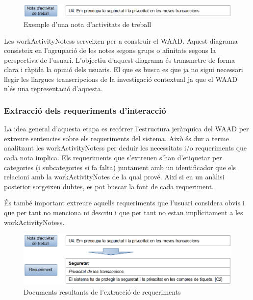 \begin{figure}[htp]
\centering
\includegraphics[scale=0.3]{WorkActivityNotes1.png}
\caption{Exemple d'una nota d'activitats de treball}\label{fig:workActivityNote1}
\end{figure}

Les \glspl{workActivityNotes} serveixen per a construir el \ac{WAAD}. Aquest diagrama consisteix en l'agrupació de les notes segons grups o afinitats segons la perspectiva de l'usuari. L'objectiu d'aquest diagrama és transmetre de forma clara i ràpida la opinió dels usuaris. El que es busca es que ja no sigui necessari llegir les llargues transcripcions de la investigació contextual ja que el \ac{WAAD} n'és una representació d'aquesta. 

\subsubsection{Extracció dels requeriments d'interacció}\label{subsubsec:Extraccio_requeriments}
La idea general d'aquesta etapa es recórrer l'estructura jeràrquica del \ac{WAAD} per extreure sentencies sobre els requeriments del sistema. Això és dur a terme analitzant les \glspl{workActivityNotes} per deduir les necessitats i/o requeriments que cada nota implica. Els requeriments que s'extreuen s'han d'etiquetar per categories (i subcategories si fa falta) juntament amb un identificador que els relacioni amb la \gls{workActivityNotes} de la qual prové. Així si en un anàlisi posterior sorgeixen dubtes, es pot buscar la font de cada requeriment. 

És també important extreure aquells requeriments que l'usuari considera obvis i que per tant no menciona ni descriu i que per tant no estan implícitament a les \glspl{workActivityNotes}.

\begin{figure}[htp]
\centering
\includegraphics[scale=0.3]{WorkActivityNotes2.png}
\caption{Documents resultants de l'extracció de requeriments}\label{fig:workActivityNote2}
\end{figure}

